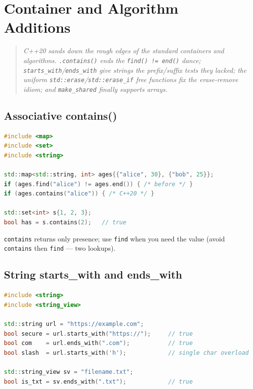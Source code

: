 \chapter{Container and Algorithm Additions}
\label{ch:c20-containers}

\begin{quote}
\emph{C++20 sands down the rough edges of the standard containers and algorithms. \texttt{.contains()} ends the \texttt{find() != end()} dance; \texttt{starts\_with}/\texttt{ends\_with} give strings the prefix/suffix tests they lacked; the uniform \texttt{std::erase}/\texttt{std::erase\_if} free functions fix the erase-remove idiom; and \texttt{make\_shared} finally supports arrays.}
\end{quote}

\section{Associative contains()}
\label{sec:c20-contains}

\begin{lstlisting}[language=C++,caption={Membership tests, before and after}]
#include <map>
#include <set>
#include <string>

std::map<std::string, int> ages{{"alice", 30}, {"bob", 25}};
if (ages.find("alice") != ages.end()) { /* before */ }
if (ages.contains("alice")) { /* C++20 */ }

std::set<int> s{1, 2, 3};
bool has = s.contains(2);   // true
\end{lstlisting}

\texttt{contains} returns only presence; use \texttt{find} when you need the value (avoid \texttt{contains} then \texttt{find} --- two lookups).

\section{String starts\_with and ends\_with}
\label{sec:c20-starts-ends-with}

\begin{lstlisting}[language=C++,caption={Prefix and suffix tests}]
#include <string>
#include <string_view>

std::string url = "https://example.com";
bool secure = url.starts_with("https://");     // true
bool com    = url.ends_with(".com");           // true
bool slash  = url.starts_with('h');            // single char overload

std::string_view sv = "filename.txt";
bool is_txt = sv.ends_with(".txt");            // true
\end{lstlisting}

